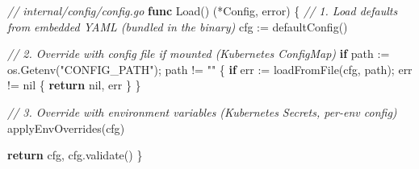 \documentclass[
]{article}
\newenvironment{Shaded}{}{}
\newcommand{\CommentTok}[1]{\textcolor[rgb]{0.38,0.63,0.69}{\textit{#1}}}
\newcommand{\ControlFlowTok}[1]{\textcolor[rgb]{0.00,0.44,0.13}{\textbf{#1}}}
\newcommand{\DataTypeTok}[1]{\textcolor[rgb]{0.56,0.13,0.00}{#1}}
\newcommand{\KeywordTok}[1]{\textcolor[rgb]{0.00,0.44,0.13}{\textbf{#1}}}
\newcommand{\NormalTok}[1]{#1}
\newcommand{\OperatorTok}[1]{\textcolor[rgb]{0.40,0.40,0.40}{#1}}
\newcommand{\OtherTok}[1]{\textcolor[rgb]{0.00,0.44,0.13}{#1}}
\newcommand{\StringTok}[1]{\textcolor[rgb]{0.25,0.44,0.63}{#1}}
\begin{document}
\begin{Shaded}
\begin{Highlighting}[]
\CommentTok{// internal/config/config.go}
\KeywordTok{func}\NormalTok{ Load}\OperatorTok{()} \OperatorTok{(*}\NormalTok{Config}\OperatorTok{,} \DataTypeTok{error}\OperatorTok{)} \OperatorTok{\{}
    \CommentTok{// 1. Load defaults from embedded YAML (bundled in the binary)}
\NormalTok{    cfg }\OperatorTok{:=}\NormalTok{ defaultConfig}\OperatorTok{()}

    \CommentTok{// 2. Override with config file if mounted (Kubernetes ConfigMap)}
    \ControlFlowTok{if}\NormalTok{ path }\OperatorTok{:=}\NormalTok{ os}\OperatorTok{.}\NormalTok{Getenv}\OperatorTok{(}\StringTok{"CONFIG\_PATH"}\OperatorTok{);}\NormalTok{ path }\OperatorTok{!=} \StringTok{""} \OperatorTok{\{}
        \ControlFlowTok{if}\NormalTok{ err }\OperatorTok{:=}\NormalTok{ loadFromFile}\OperatorTok{(}\NormalTok{cfg}\OperatorTok{,}\NormalTok{ path}\OperatorTok{);}\NormalTok{ err }\OperatorTok{!=} \OtherTok{nil} \OperatorTok{\{}
            \ControlFlowTok{return} \OtherTok{nil}\OperatorTok{,}\NormalTok{ err}
        \OperatorTok{\}}
    \OperatorTok{\}}

    \CommentTok{// 3. Override with environment variables (Kubernetes Secrets, per{-}env config)}
\NormalTok{    applyEnvOverrides}\OperatorTok{(}\NormalTok{cfg}\OperatorTok{)}

    \ControlFlowTok{return}\NormalTok{ cfg}\OperatorTok{,}\NormalTok{ cfg}\OperatorTok{.}\NormalTok{validate}\OperatorTok{()}
\OperatorTok{\}}


\end{Highlighting}
\end{Shaded}
\end{document}
